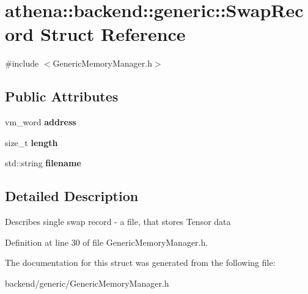 \hypertarget{structathena_1_1backend_1_1generic_1_1_swap_record}{}\section{athena\+:\+:backend\+:\+:generic\+:\+:Swap\+Record Struct Reference}
\label{structathena_1_1backend_1_1generic_1_1_swap_record}


{\ttfamily \#include $<$Generic\+Memory\+Manager.\+h$>$}

\subsection*{Public Attributes}
\begin{DoxyCompactItemize}
\item 
\mbox{\label{structathena_1_1backend_1_1generic_1_1_swap_record_ac3ffe37973d1992220844a94c8b6afcb}} 
vm\+\_\+word {\bfseries address}
\item 
\mbox{\label{structathena_1_1backend_1_1generic_1_1_swap_record_ad4851011bc4d109f47c5610e817978de}} 
size\+\_\+t {\bfseries length}
\item 
\mbox{\label{structathena_1_1backend_1_1generic_1_1_swap_record_ae3f76aea814f0e9b0d6fabbfa349c54a}} 
std\+::string {\bfseries filename}
\end{DoxyCompactItemize}


\subsection{Detailed Description}
Describes single swap record -\/ a file, that stores Tensor data 

Definition at line 30 of file Generic\+Memory\+Manager.\+h.



The documentation for this struct was generated from the following file\+:\begin{DoxyCompactItemize}
\item 
backend/generic/Generic\+Memory\+Manager.\+h\end{DoxyCompactItemize}
